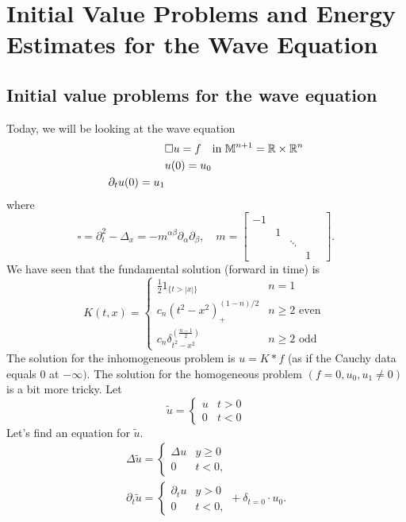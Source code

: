 \newpage

\section{Initial Value Problems and Energy Estimates for the Wave Equation}

\subsection{Initial value problems for the wave equation}

Today, we will be looking at the wave equation
\begin{align*}
    &\square u = f \quad \text{in } \mathbb{M}^{n+1} = \mathbb{R} \times \mathbb{R}^{n}\\
    & u(0) = u_0\\
    \partial_t u(0) = u_1
\end{align*}
where 
\[
    \square = \partial_t^2 -\Delta_x = - m^{\alpha \beta}\partial_\alpha \partial_\beta, \quad m=\left[\begin{array}{lllll}
        -1 & & & & \\
        & 1 & & & \\
        & & \ddots & \\
        & & & 1
        \end{array}\right].
\]
We have seen that the fundamental solution (forward in time) is
$$
K(t, x)= \begin{cases}\frac{1}{2} 1_{\{t>|x|\}} & n=1 \\ c_{n}\left(t^{2}-x^{2}\right)_{+}^{(1-n) / 2} & n \geq 2 \text { even } \\ c_{n} \delta_{t^{2}-x^{2}}^{\left(\frac{n-1}{2}\right)} & n \geq 2 \text { odd }\end{cases}
$$
The solution for the inhomogeneous problem is $u=K * f$ (as if the Cauchy data equals 0 at $-\infty)$. The solution for the homogeneous problem $\left(f=0, u_{0}, u_{1} \neq 0\right)$ is a bit more tricky. Let
$$
\tilde{u}= \begin{cases}u & t>0 \\ 0 & t<0\end{cases}
$$
Let's find an equation for $\tilde{u}$.
$$
\begin{gathered}
\Delta \widetilde{u}= \begin{cases}\Delta u & y \geq 0 \\
0 & t<0,\end{cases} \\
\partial_{t} \widetilde{u}=\left\{\begin{array}{ll}
\partial_{t} u & y>0 \\
0 & t<0,
\end{array}+\delta_{t=0} \cdot u_{0} .\right.
\end{gathered}
$$
